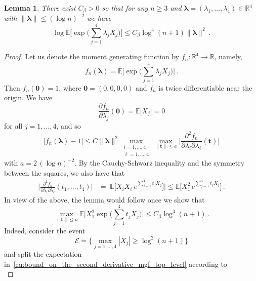 \documentclass[11pt]{amsart}
\newtheorem{lemma}[theorem]{Lemma}
\theoremstyle{definition}
\theoremstyle{remark}
\numberwithin{equation}{section}
\def\la{{\lambda}}
\newcommand{\bR}{\mathbb R}
\newcommand{\bE}{\mathbb E}
\begin{document}
	\begin{lemma}
		\label{lemma:upper_bound_on_MGF_top_level_small_input}
		There exist $C_\beta>0$ so that for any $n\ge 3$ and $\boldsymbol{\la} = (\la_1,\ldots,\la_4)\in \bR^4$ with  \(
		\|\boldsymbol{\la}\|\le (\log n)^{-2}\) we have
		\begin{equation*}
			\log\bE\bigg[\exp\Big(\sum_{j=1}^{4} \la_j X_j\Big)\bigg] \le  C_\beta \log^4(n+1)\|\boldsymbol{\la} \|^2 \, .
		\end{equation*} 
	\end{lemma}
	\begin{proof}
		Let us denote the moment generating function by $f_n:\bR^4 \to \bR$, namely,
		\begin{equation*}
			f_n(\boldsymbol{\la}) = \bE\bigg[\exp\Big(\sum_{j=1}^{4} \la_j X_j\Big)\bigg]\, .
		\end{equation*}
		Then $f_n(\boldsymbol{0}) = 1$, where $\boldsymbol{0} = (0,0,0,0)$ and $f_n$ is twice differentiable near the origin. We have
		\[
		\frac{\partial f_n}{\partial \la_j} (\boldsymbol{0}) = \bE\big[X_j\big] = 0
		\]
		for all $j=1,\ldots,4$, and so
		\[
		\big|f_n(\boldsymbol{\la}) - 1\big|\le  C \|\boldsymbol{\la}\|^2 \max_{\substack{i=1,\ldots,4 \\ \ell=1,\ldots,4}} \max_{\|\boldsymbol{t} \|\le a} \Big|\frac{\partial^2 f_n}{\partial \la_i \partial \la_\ell} (\boldsymbol{t})\Big| 
		\]
		with $a = 2\, (\log n)^{-2}$. By the Cauchy-Schwarz inequality and the symmetry between the squares, we also have that
		\begin{align*}
			\Big|\frac{\partial^2 f_n}{\partial \la_i \partial \la_\ell} (t_1,\ldots,t_4)\Big| &= \Big|\bE\Big[X_i X_\ell \, e^{\sum_{j=1}^{4}t_j X_j}\Big]\Big| \le \bE\Big[X_1^2 \, e^{\sum_{j=1}^{4}t_j X_j}\Big]\, .
		\end{align*}
		In view of the above, the lemma would follow once we show that
		\begin{equation}
			\label{eq:bound_on_the_second_derivative_mgf_top_level}
			\max_{\|\boldsymbol{t} \|\le a} \bE\Big[X_1^2 \exp\Big(\sum_{j=1}^{4}t_j X_j\Big)\Big] \le C_\beta \log^4(n+1) \, . 
		\end{equation}
		Indeed, consider the event
		\begin{equation*}
			\mathcal{E} = \Big\{ \max_{j=1,\ldots,4} |X_j| \ge \log^2 (n+1) \Big\}
		\end{equation*}
		and split the expectation in~\eqref{eq:bound_on_the_second_derivative_mgf_top_level} according to
		\begin{equation*}

\end{equation*}
\end{proof}
\end{document}
